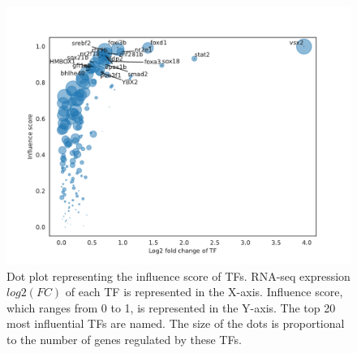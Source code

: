 \begin{figure}[hp!]
\centering
\includegraphics[width=1\textwidth]{Figures/astyanax/influence_plot_24hpf_cave_2_surface}
\caption[ANANSE influence plot]{Dot plot representing the influence score of TFs. RNA-seq expression $log2(FC)$ of each TF is represented in the X-axis. Influence score, which ranges from 0 to 1, is represented in the Y-axis. The top 20 most influential TFs are named. The size of the dots is proportional to the number of genes regulated by these TFs.}
\label{fig:Ananse_networks_plot}
\end{figure}


